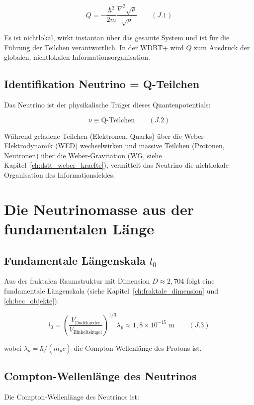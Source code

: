 \[
Q = -\frac{\hbar^2}{2m} \frac{\nabla^2 \sqrt{\rho}}{\sqrt{\rho}} \qquad (J.1)
\]

Es ist nichtlokal, wirkt instantan über das gesamte System und ist für die Führung 
der Teilchen verantwortlich. In der WDBT+ wird $Q$ zum Ausdruck der globalen, 
nichtlokalen Informationsorganisation.

\subsection{Identifikation Neutrino = Q-Teilchen}
\label{sub:neutrino_oszillation_identifikation}

Das Neutrino ist der physikalische Träger dieses Quantenpotentials:

\[
\nu \equiv \text{Q-Teilchen} \qquad (J.2)
\]

Während geladene Teilchen (Elektronen, Quarks) über die Weber-Elektrodynamik (WED) 
wechselwirken und massive Teilchen (Protonen, Neutronen) über die Weber-Gravitation (WG, 
siehe Kapitel~\ref{ch:dstt_weber_kraefte}), vermittelt das Neutrino die nichtlokale Organisation 
des Informationsfeldes.

\section{Die Neutrinomasse aus der fundamentalen Länge}
\label{app:neutrino_oszillation_masse}

\subsection{Fundamentale Längenskala $l_0$}
\label{sub:neutrino_oszillation_l0}

Aus der fraktalen Raumstruktur mit Dimension $D \approx 2,704$ folgt eine fundamentale 
Längenskala (siehe Kapitel~\ref{ch:fraktale_dimension} und \ref{ch:bec_objekte}):

\[
l_0 = \left( \frac{V_{\text{Dodekaeder}}}{V_{\text{Einheitskugel}}} \right)^{1/3} \lambda_p \approx 1,8 \times 10^{-15} \text{ m} \qquad (J.3)
\]

wobei $\lambda_p = \hbar/(m_p c)$ die Compton-Wellenlänge des Protons ist.

\subsection{Compton-Wellenlänge des Neutrinos}
\label{sub:neutrino_oszillation_compton}

Die Compton-Wellenlänge des Neutrinos ist:


